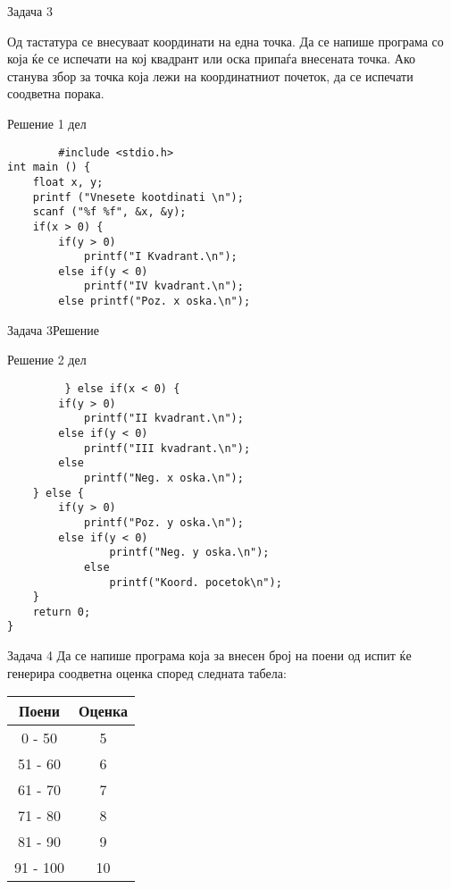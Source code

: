 \begin{frame}[fragile]{Задача 3}
\begin{scriptsize}
Од тастатура се внесуваат координати на една точка. Да се напише програма со која ќе се испечати на кој квадрант или оска припаѓа внесената точка. Ако станува збор за точка која лежи на координатниот почеток, да се испечати соодветна порака.
\end{scriptsize}
\pause
	\begin{exampleblock}{Решение 1 дел}
	\begin{lstlisting}
		#include <stdio.h> 
int main () { 
    float x, y;
    printf ("Vnesete kootdinati \n"); 
    scanf ("%f %f", &x, &y); 
    if(x > 0) { 
        if(y > 0) 
            printf("I Kvadrant.\n");
        else if(y < 0)
            printf("IV kvadrant.\n"); 
        else printf("Poz. x oska.\n");
		\end{lstlisting}
	\end{exampleblock}
\end{frame}



\begin{frame}[fragile]{Задача 3}{Решение}
	\begin{exampleblock}{Решение 2 дел}
		\begin{lstlisting}
		 } else if(x < 0) {
        if(y > 0)
            printf("II kvadrant.\n");
        else if(y < 0) 
            printf("III kvadrant.\n");
        else
            printf("Neg. x oska.\n");
    } else {
        if(y > 0)
            printf("Poz. y oska.\n");
        else if(y < 0)
                printf("Neg. y oska.\n");
            else
                printf("Koord. pocetok\n");
    }
    return 0; 
}
		\end{lstlisting}
	\end{exampleblock}
\end{frame}



\begin{frame}[fragile]{Задача 4}
Да се напише програма која за внесен број на поени од испит ќе генерира соодветна оценка според следната табела:
\begin{center}
\begin{tabular}{|c|c|}
\hline \textbf{Поени} & \textbf{Оценка} \\ 
\hline 0 - 50 & 5 \\ 
\hline 51 - 60 & 6 \\ 
\hline 61 - 70 & 7 \\ 
\hline 71 - 80 & 8 \\ 
\hline 81 - 90 & 9 \\ 
\hline 91 - 100 & 10 \\ 
\hline
\end{tabular} 
\end{center}
\end{frame}

